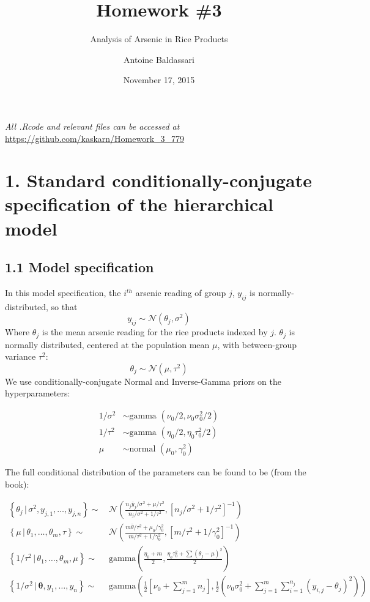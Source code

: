 \documentclass[]{article}
\title{Homework \#3}
\subtitle{Analysis of Arsenic in Rice Products}
\author{Antoine Baldassari}
\date{November 17, 2015}
\begin{document}
\maketitle


\textit{All .Rcode and relevant files can be accessed at}
\url{https://github.com/kaskarn/Homework_3_779}
\section{1. Standard conditionally-conjugate specification of the hierarchical model}
\subsection{1.1 Model specification}

In this model specification, the \(i^{th}\) arsenic reading of group
\(j\), \(y_{ij}\) is normally-distributed, so that
\[y_{ij} \sim \mathcal{N}\left( \theta_j, \sigma^2 \right)\] Where
\(\theta_j\) is the mean arsenic reading for the rice products indexed
by \(j\). \(\theta_j\) is normally distributed, centered at the
population mean \(\mu\), with between-group variance \(\tau^2\):
\[\theta_j \sim \mathcal{N}\left( \mu, \tau^2 \right) \] We use
conditionally-conjugate Normal and Inverse-Gamma priors on the
hyperparameters:

\begin{align*}
        1/\sigma^2 & \sim \text{gamma }(\nu_0/2, \nu_0\sigma^2_0/2)\\
        1/\tau^2 & \sim \text{gamma }(\eta_0/2,\eta_0\tau_0^2/2)\\
        \mu & \sim \text{normal }(\mu_0, \gamma_0^2)
    \end{align*}

The full conditional distribution of the parameters can be found to be
(from the book):

\begin{align*}
        \left\{ \theta_j \, | \, \sigma^2, y_{j,1},\ldots,y_{j,n} \right\} \sim& \, \mathcal{N}\left( \frac{n_j\bar{y}_j/\sigma^2+\mu/\tau^2}{n_j/\sigma^2 + 1/\tau^2}, \left[ n_j/\sigma^2+1/\tau^2\right]^{-1} \right) \\
        \left\{\mu \, | \, \theta_1,\ldots,\theta_m,\tau \right\} \sim& \, \mathcal{N} \left( \frac{m\bar{\theta}/\tau^2 + \mu_0/\gamma_0^2}{m/\tau^2+1/\gamma_0^2},\left[ m/\tau^2 + 1/\gamma_0^2\right]^{-1} \right)\\
        \left\{ 1/\tau^2 \, | \, \theta_1, \ldots, \theta_m, \mu \right\} \sim& \, \text{gamma}\left( \frac{\eta_0 +m}{2},\frac{\eta_o\tau^2_0+\sum\left(\theta_j -\mu \right)^2}{2} \right) \\
        \left\{1/\sigma^2 \, | \, \boldsymbol{\theta}, y_1, \ldots, y_n \right\} \sim& \, \text{gamma}\left( \frac{1}{2}\left[ \nu_0 + \sum\limits_{j=1}^m n_j \right], \frac{1}{2}\left(\nu_0\sigma_0^2 + \sum\limits_{j=1}^m \sum\limits_{i=1}^{n_j} \left(y_{i,j} -\theta_j \right)^2 \right)\right)
    \end{align*}
\end{document}
